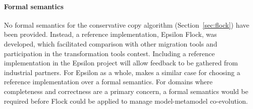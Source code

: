 \paragraph{Formal semantics} No formal semantics for the conservative copy algorithm (Section~\ref{sec:flock}) have been provided. Instead, a reference implementation, Epsilon Flock, was developed, which facilitated comparison with other migration tools and participation in the transformation tools contest. Including a reference implementation in the Epsilon project will allow feedback to be gathered from industrial partners. For Epsilon as a whole, \cite{kolovos09thesis} makes a similar case for choosing a reference implementation over a formal semantics. For domains where completeness and correctness are a primary concern, a formal semantics would be required before Flock could be applied to manage model-metamodel co-evolution.  